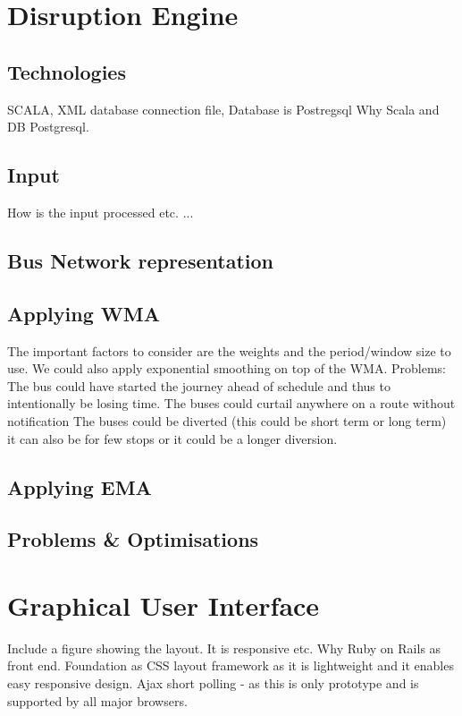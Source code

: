 \section{Disruption Engine}
	\subsection{Technologies}
	SCALA, XML database connection file, Database is Postregsql
	Why Scala and DB Postgresql.
	\subsection{Input}
	How is the input processed etc. ...
	\subsection{Bus Network representation}
	
	\subsection{Applying WMA}
	The important factors to consider are the weights and the period/window size to use. We could also apply exponential smoothing on top of the WMA.
	Problems:
The bus could have started the journey ahead of schedule and thus to intentionally be losing time.
The buses could curtail anywhere on a route without notification
The buses could be diverted (this could be short term or long term) it can also be for few stops or it could be a longer diversion.

	\subsection{Applying EMA}
	
	\subsection{Problems \& Optimisations}
	
\section{Graphical User Interface}
Include a figure showing the layout. It is responsive etc.
Why Ruby on Rails as front end. Foundation as CSS layout framework as it is lightweight and it enables easy responsive design.
Ajax short polling - as this is only prototype and is supported by all major browsers.




